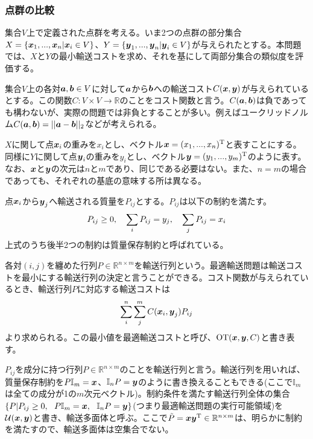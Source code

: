 \documentclass[dvipdfmx, 9pt, a4paper]{jsarticle}
\newcommand{\bm}[1]{{\mbox{\boldmath $#1$}}}
\begin{document}
\subsubsection{点群の比較}
集合$V$上で定義された点群を考える。いま2つの点群の部分集合$X=\{\bm x_1, ..., \bm x_n|\bm x_i \in V\}$、$Y=\{\bm y_1, ..., \bm y_n|\bm y_i \in V\}$が与えられたとする。本問題では、$X$と$Y$の最小輸送コストを求め、それを基にして両部分集合の類似度を評価する。\par
集合$V$上の各対$\bm a, \bm b \in V$に対して$\bm a$から$\bm b$への輸送コスト$C(\bm x, \bm y)$が与えられているとする。この関数$C:V \times V \to \mathbb{R}$のことをコスト関数と言う。$C(\bm a, \bm b)$は負であっても構わないが、実際の問題では非負とすることが多い。例えばユークリッドノルム$C(\bm a, \bm b)=||\bm a-\bm b||_2$などが考えられる。\par
$X$に関して点$\bm x_i$の重みを$x_i$とし、ベクトル$\bm x=(x_1, ..., x_n)^{\rm T}$と表すことにする。同様に$Y$に関して点$\bm y_i$の重みを$y_i$とし、ベクトル$\bm y=(y_1, ..., y_m)^{\rm T}$のように表す。なお、$\bm x$と$\bm y$の次元は$n$と$m$であり、同じである必要はない。また、$n=m$の場合であっても、それぞれの基底の意味する所は異なる。\par
点$\bm x_i$から$\bm y_j$へ輸送される質量を$P_{ij}$とする。$P_{ij}$は以下の制約を満たす。
\begin{equation}
P_{ij} \geq 0,~~~\sum_i P_{ij}=y_j,~~~\sum_j P_{ij}=x_i \notag
\end{equation}
上式のうち後半2つの制約は質量保存制約と呼ばれている。\par
各対$(i, j)$を纏めた行列$P\in \mathbb{R}^{n\times m}$を輸送行列という。最適輸送問題は輸送コストを最小にする輸送行列の決定と言うことができる。コスト関数が与えられているとき、輸送行列$P$に対応する輸送コストは
\begin{equation}
\sum_i^n\sum_j^mC(\bm x_i, \bm y_j)P_{ij} \notag
\end{equation}
より求められる。この最小値を最適輸送コストと呼び、${\rm OT}(\bm x, \bm y, C)$と書き表す。\par
$P_{ij}$を成分に持つ行列$P \in \mathbb{R}^{n \times m}$のことを輸送行列と言う。輸送行列を用いれば、質量保存制約を$P\mathbb{I}_m=\bm x$、$\mathbb{I}_nP=\bm y$のように書き換えることもできる(ここで$\mathbb{I}_m$は全ての成分が1の$m$次元ベクトル)。制約条件を満たす輸送行列全体の集合$\{P|P_{ij} \geq 0,~~P\mathbb{I}_m=\bm x,~~\mathbb{I}_nP=\bm y\}$(つまり最適輸送問題の実行可能領域)を$\mathcal{U}(\bm x, \bm y)$と書き、輸送多面体と呼ぶ。ここで$\tilde{P}=\bm x\bm y^{\rm T} \in \mathbb{R}^{n \times m}$は、明らかに制約を満たすので、輸送多面体は空集合でない。\par
\end{document}
